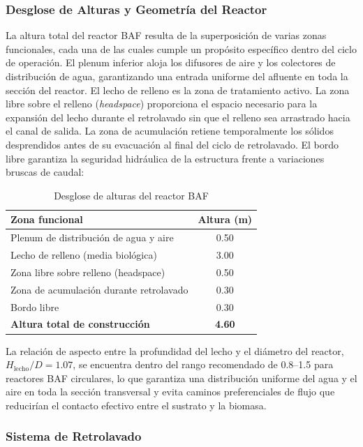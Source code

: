 \documentclass[12pt,a4paper]{article}
\begin{document}
\subsubsection*{Desglose de Alturas y Geometría del Reactor}

La altura total del reactor BAF resulta de la superposición de varias zonas funcionales, cada una de las cuales cumple un propósito específico dentro del ciclo de operación. El plenum inferior aloja los difusores de aire y los colectores de distribución de agua, garantizando una entrada uniforme del afluente en toda la sección del reactor. El lecho de relleno es la zona de tratamiento activo. La zona libre sobre el relleno (\textit{headspace}) proporciona el espacio necesario para la expansión del lecho durante el retrolavado sin que el relleno sea arrastrado hacia el canal de salida. La zona de acumulación retiene temporalmente los sólidos desprendidos antes de su evacuación al final del ciclo de retrolavado. El bordo libre garantiza la seguridad hidráulica de la estructura frente a variaciones bruscas de caudal:

\begin{table}[H]
\centering
\caption{Desglose de alturas del reactor BAF}
\begin{tabular}{lc}
\toprule
\textbf{Zona funcional} & \textbf{Altura (m)} \\
\midrule
Plenum de distribución de agua y aire & 0.50 \\
Lecho de relleno (media biológica) & 3.00 \\
Zona libre sobre relleno (headspace) & 0.50 \\
Zona de acumulación durante retrolavado & 0.30 \\
Bordo libre & 0.30 \\
\midrule
\textbf{Altura total de construcción} & \textbf{4.60} \\
\bottomrule
\end{tabular}
\end{table}

La relación de aspecto entre la profundidad del lecho y el diámetro del reactor, $H_{\text{lecho}} / D = 1.07$, se encuentra dentro del rango recomendado de 0.8--1.5 para reactores BAF circulares, lo que garantiza una distribución uniforme del agua y el aire en toda la sección transversal y evita caminos preferenciales de flujo que reducirían el contacto efectivo entre el sustrato y la biomasa.

\subsubsection*{Sistema de Retrolavado}
\end{document}
